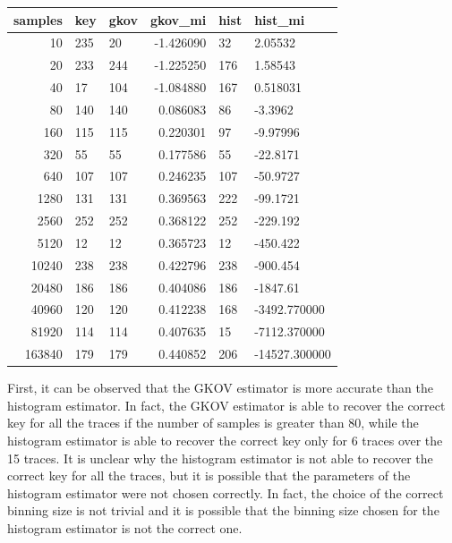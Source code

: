 \documentclass[12pt]{article}
\begin{document}
    \vspace{0.5cm}
    \begin{tabular}{rllrll}
        \toprule
        samples & key & gkov & gkov\_mi  & hist & hist\_mi      \\
        \midrule
        10      & 235 & 20   & -1.426090 & 32   & 2.05532       \\
        20      & 233 & 244  & -1.225250 & 176  & 1.58543       \\
        40      & 17  & 104  & -1.084880 & 167  & 0.518031      \\
        80      & 140 & 140  & 0.086083  & 86   & -3.3962       \\
        160     & 115 & 115  & 0.220301  & 97   & -9.97996      \\
        320     & 55  & 55   & 0.177586  & 55   & -22.8171      \\
        640     & 107 & 107  & 0.246235  & 107  & -50.9727      \\
        1280    & 131 & 131  & 0.369563  & 222  & -99.1721      \\
        2560    & 252 & 252  & 0.368122  & 252  & -229.192      \\
        5120    & 12  & 12   & 0.365723  & 12   & -450.422      \\
        10240   & 238 & 238  & 0.422796  & 238  & -900.454      \\
        20480   & 186 & 186  & 0.404086  & 186  & -1847.61      \\
        40960   & 120 & 120  & 0.412238  & 168  & -3492.770000  \\
        81920   & 114 & 114  & 0.407635  & 15   & -7112.370000  \\
        163840  & 179 & 179  & 0.440852  & 206  & -14527.300000 \\
        \bottomrule
    \end{tabular}
    \vspace{0.5cm}

    First, it can be observed that the GKOV estimator is more accurate than the histogram estimator.
    In fact, the GKOV estimator is able to recover the correct key for all the traces if the number of samples is greater than 80, while the histogram estimator is able to recover the correct key only for 6 traces over the 15 traces.
    It is unclear why the histogram estimator is not able to recover the correct key for all the traces, but it is possible that the parameters of the histogram estimator were not chosen correctly.
    In fact, the choice of the correct binning size is not trivial and it is possible that the binning size chosen for the histogram estimator is not the correct one.
\end{document}
